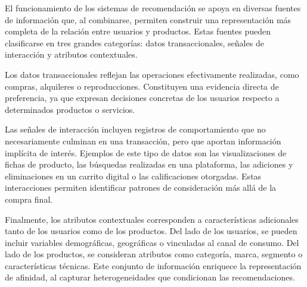 


El funcionamiento de los sistemas de recomendación se apoya en diversas fuentes de información que, al combinarse, permiten construir una representación más completa de la relación entre usuarios y productos. Estas fuentes pueden clasificarse en tres grandes categorías: datos transaccionales, señales de interacción y atributos contextuales.

Los datos transaccionales reflejan las operaciones efectivamente realizadas, como compras, alquileres o reproducciones. Constituyen una evidencia directa de preferencia, ya que expresan decisiones concretas de los usuarios respecto a determinados productos o servicios.

Las señales de interacción incluyen registros de comportamiento que no necesariamente culminan en una transacción, pero que aportan información implícita de interés. Ejemplos de este tipo de datos son las visualizaciones de fichas de producto, las búsquedas realizadas en una plataforma, las adiciones y eliminaciones en un carrito digital o las calificaciones otorgadas. Estas interacciones permiten identificar patrones de consideración más allá de la compra final.

Finalmente, los atributos contextuales corresponden a características adicionales tanto de los usuarios como de los productos. Del lado de los usuarios, se pueden incluir variables demográficas, geográficas o vinculadas al canal de consumo. Del lado de los productos, se consideran atributos como categoría, marca, segmento o características técnicas. Este conjunto de información enriquece la representación de afinidad, al capturar heterogeneidades que condicionan las recomendaciones.

